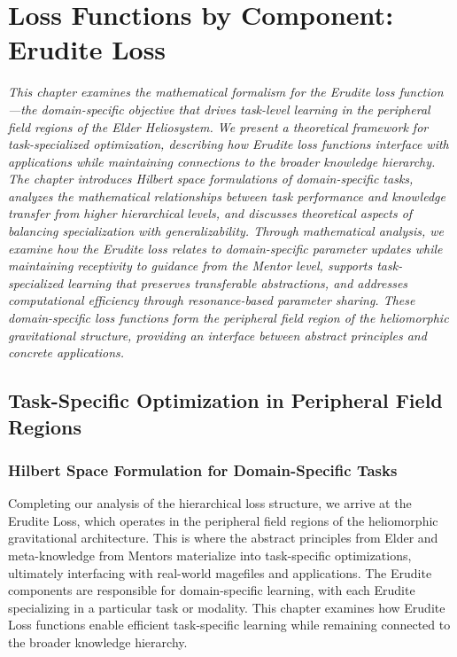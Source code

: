 \chapter{Loss Functions by Component: Erudite Loss}

\textit{This chapter examines the mathematical formalism for the Erudite loss function—the domain-specific objective that drives task-level learning in the peripheral field regions of the Elder Heliosystem. We present a theoretical framework for task-specialized optimization, describing how Erudite loss functions interface with applications while maintaining connections to the broader knowledge hierarchy. The chapter introduces Hilbert space formulations of domain-specific tasks, analyzes the mathematical relationships between task performance and knowledge transfer from higher hierarchical levels, and discusses theoretical aspects of balancing specialization with generalizability. Through mathematical analysis, we examine how the Erudite loss relates to domain-specific parameter updates while maintaining receptivity to guidance from the Mentor level, supports task-specialized learning that preserves transferable abstractions, and addresses computational efficiency through resonance-based parameter sharing. These domain-specific loss functions form the peripheral field region of the heliomorphic gravitational structure, providing an interface between abstract principles and concrete applications.}

\section{Task-Specific Optimization in Peripheral Field Regions}

\subsection{Hilbert Space Formulation for Domain-Specific Tasks}

Completing our analysis of the hierarchical loss structure, we arrive at the Erudite Loss, which operates in the peripheral field regions of the heliomorphic gravitational architecture. This is where the abstract principles from Elder and meta-knowledge from Mentors materialize into task-specific optimizations, ultimately interfacing with real-world magefiles and applications. The Erudite components are responsible for domain-specific learning, with each Erudite specializing in a particular task or modality. This chapter examines how Erudite Loss functions enable efficient task-specific learning while remaining connected to the broader knowledge hierarchy.

